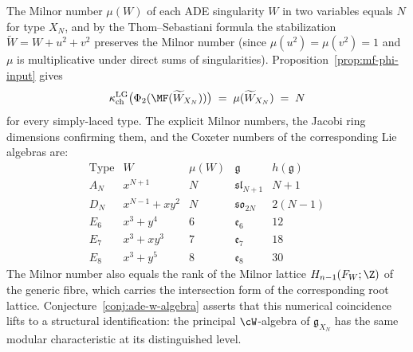 \begin{remark}
\label{rem:mf-ade-milnor-table}
The Milnor number $\mu(W)$ of each ADE singularity $W$ in two variables equals $N$ for type $X_N$, and by the Thom--Sebastiani formula the stabilization $\widetilde{W} = W + u^2 + v^2$ preserves the Milnor number (since $\mu(u^2) = \mu(v^2) = 1$ and $\mu$ is multiplicative under direct sums of singularities). Proposition~\ref{prop:mf-phi-input} gives
\[
 \kappa_{\mathrm{ch}}^{\mathrm{LG}}\bigl(\Phi_2(\MF(\widetilde{W}_{X_N}))\bigr) \;=\; \mu(\widetilde{W}_{X_N}) \;=\; N
\]
for every simply-laced type. The explicit Milnor numbers, the Jacobi ring dimensions confirming them, and the Coxeter numbers of the corresponding Lie algebras are:
\[
 \renewcommand{\arraystretch}{1.2}
 \begin{array}{c|c|c|c|c}
 \text{Type} & W & \mu(W) & \mathfrak{g} & h(\mathfrak{g}) \\
 \hline
 A_N & x^{N+1} & N & \mathfrak{sl}_{N+1} & N+1 \\
 D_N & x^{N-1} + xy^2 & N & \mathfrak{so}_{2N} & 2(N-1) \\
 E_6 & x^3 + y^4 & 6 & \mathfrak{e}_6 & 12 \\
 E_7 & x^3 + xy^3 & 7 & \mathfrak{e}_7 & 18 \\
 E_8 & x^3 + y^5 & 8 & \mathfrak{e}_8 & 30
 \end{array}
\]
The Milnor number also equals the rank of the Milnor lattice $H_{n-1}(F_W; \Z)$ of the generic fibre, which carries the intersection form of the corresponding root lattice. Conjecture~\ref{conj:ade-w-algebra} asserts that this numerical coincidence lifts to a structural identification: the principal $\cW$-algebra of $\mathfrak{g}_{X_N}$ has the same modular characteristic at its distinguished level.
\end{remark}

